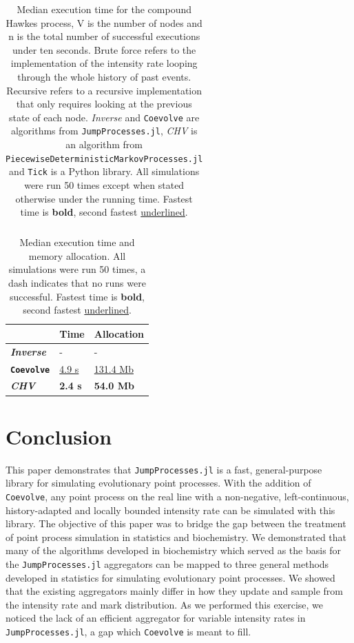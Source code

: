 \documentclass{juliacon}
\numberwithin{equation}{section}
\begin{document}
\begin{table}
\begin{tabular}{clllllll}
\bottomrule
\end{tabular}
\caption{Median execution time for the compound Hawkes process, V is the number of nodes and n is the total number of successful executions under ten seconds. Brute force refers to the implementation of the intensity rate looping through the whole history of past events. Recursive refers to a recursive implementation that only requires looking at the previous state of each node. \textit{Inverse} and \texttt{Coevolve} are algorithms from \texttt{JumpProcesses.jl}, \textit{CHV} is an algorithm from \texttt{PiecewiseDeterministicMarkovProcesses.jl} and \texttt{Tick} is a Python library. All simulations were run 50 times except when stated otherwise under the running time. Fastest time is \textbf{bold}, second fastest \underline{underlined}.}
\label{tab:benchmark-hawkes}
\end{table}

\begin{table}
\centering
\begin{tabular}{lll} 
\toprule
 & \textbf{Time} & \textbf{Allocation}  \\ 
\hline
\textbf{\textit{Inverse}} & -  & - \\ 
\textbf{\texttt{Coevolve}} & \underline{4.9 s} & \underline{131.4 Mb}  \\
\textbf{\textit{CHV}} & \textbf{2.4 s} & \textbf{54.0 Mb} \\
\bottomrule
\end{tabular}
\caption{Median execution time and memory allocation. All simulations were run 50 times, a dash indicates that no runs were successful. Fastest time is \textbf{bold}, second fastest \underline{underlined}.}
\label{tab:benchmark-synapse}
\end{table}

\section{Conclusion}

This paper demonstrates that \texttt{JumpProcesses.jl} is a fast, general-purpose library for simulating evolutionary point processes. With the addition of \texttt{Coevolve}, any point process on the real line with a non-negative, left-continuous, history-adapted and locally bounded intensity rate can be simulated with this library. The objective of this paper was to bridge the gap between the treatment of point process simulation in statistics and biochemistry. We demonstrated that many of the algorithms developed in biochemistry which served as the basis for the \texttt{JumpProcesses.jl} aggregators can be mapped to three general methods developed in statistics for simulating evolutionary point processes. We showed that the existing aggregators mainly differ in how they update and sample from the intensity rate and mark distribution. As we performed this exercise, we noticed the lack of an efficient aggregator for variable intensity rates in \texttt{JumpProcesses.jl}, a gap which \texttt{Coevolve} is meant to fill.
\end{document}
